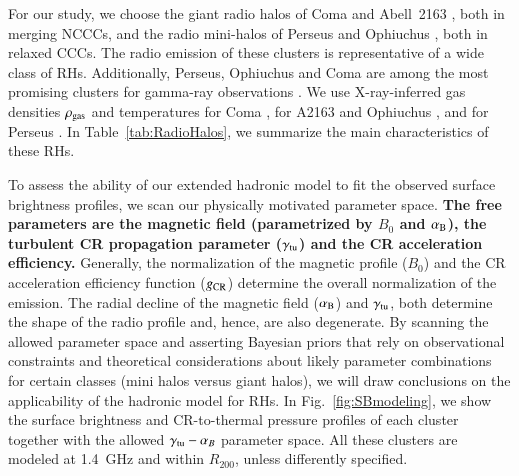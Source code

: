 \documentclass[useAMS,usenatbib]{mn2e}
\begin{document}
For our study, we choose the giant radio halos of Coma
\citep{1997A&A...321...55D} and Abell~2163 \citep{2001A&A...373..106F,
  2009A&A...499..679M}, both in merging NCCCs, and the radio mini-halos of
Perseus \citep{1990MNRAS.246..477P} and Ophiuchus \citep{2009A&A...499..371G,
  2009A&A...499..679M}, both in relaxed CCCs. The radio emission of these
clusters is representative of a wide class of RHs.  Additionally, Perseus,
Ophiuchus and Coma are among the most promising clusters for gamma-ray
observations \citep{2010MNRAS.409..449P,2011arXiv1105.3240P}. 
We use X-ray-inferred gas densities $\rho_{{\mathrm{gas}}}$ and temperatures 
for Coma \citep{1992A&A...259L..31B}, for A2163 and Ophiuchus 
\citep{2002ApJ...567..716R}, and for Perseus \citep{2003ApJ...590..225C}. 
In Table~\ref{tab:RadioHalos}, we summarize the main characteristics of these RHs.
 
To assess the ability of our extended hadronic model to fit the observed surface
brightness profiles, we scan our physically motivated parameter space. {\bf The
  free parameters are the magnetic field (parametrized by $B_0$ and $
  \alpha_{{\mathrm{B}}}$), the turbulent CR propagation parameter
  ($\gamma_{{\mathrm{tu}}}$) and the CR acceleration efficiency.} Generally, the
normalization of the magnetic profile ($B_0$) and the CR acceleration efficiency
function ($g_{{\mathrm{CR}}}$) determine the overall normalization of the
emission. The radial decline of the magnetic field ($ \alpha_{{\mathrm{B}}}$) and
$\gamma_{{\mathrm{tu}}}$, both determine the shape of the radio profile and, hence,
are also degenerate.  By scanning the allowed parameter space and asserting
Bayesian priors that rely on observational constraints and theoretical
considerations about likely parameter combinations for certain classes (mini
halos versus giant halos), we will draw conclusions on the applicability of the
hadronic model for RHs.  In Fig.~\ref{fig:SBmodeling}, we show the surface
brightness and CR-to-thermal pressure profiles of each cluster together with the
allowed $\gamma_{{\mathrm{tu}}}-\alpha_{B}$ parameter space.  All these clusters are
modeled at 1.4~GHz and within $R_{200}$, unless differently specified.
\end{document}

